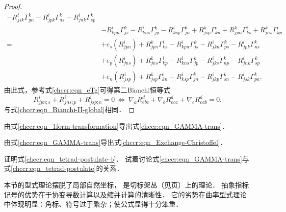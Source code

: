 \begin{proof}
\begin{align*}
        -R_{jsk}^i \Gamma_{pn}^k -R_{jpk}^i \Gamma_{ns}^k -R_{jnk}^i \Gamma_{sp}^k  \\
        & -R_{kpn}^i \Gamma_{js}^k -R_{kns}^i \Gamma_{jp}^k -R_{ksp}^i \Gamma_{jn}^k
        +R_{jsp}^k \Gamma_{kn}^i +R_{jpn}^k \Gamma_{ks}^i +R_{jns}^k \Gamma_{kp}^i  \\
        =& +e_{s} (R_{jpn}^i)+R_{jpn}^k \Gamma_{ks}^i -R_{kpn}^i \Gamma_{js}^k
        -R_{jkn}^i \Gamma_{ps}^k    -R_{jpk}^i \Gamma_{ns}^k \\
        &+e_{p} (R_{jns}^i)+R_{jns}^k \Gamma_{kp}^i  -R_{kns}^i \Gamma_{jp}^k
        -R_{jks}^i \Gamma_{np}^k       -R_{jnk}^i \Gamma_{sp}^k   \\
        &+e_{n} (R_{jsp}^i) +R_{jsp}^k \Gamma_{kn}^i -R_{ksp}^i \Gamma_{jn}^k
        -R_{jkp}^i \Gamma_{sn}^k       -R_{jsk}^i \Gamma_{pn}^k   .
    \end{align*}
    由此式，参考式\eqref{chccr:eqn_eTg}可得第二Bianchi恒等式
    \begin{equation}\label{chccr:eqn_Bianchi-II}
       R^i_{jpn;s} + R^i_{jns;p} + R^i_{jsp;n} =0 
       \ \Leftrightarrow \ 
        \nabla_a R^d_{ebc} + \nabla_b R^d_{eca}+ \nabla_c R^d_{eab} =0 .
    \end{equation}
    与式\eqref{chccr:eqn_Bianchi-II-global}相同．
\end{proof}

\begin{exercise}
	由式\eqref{chccr:eqn_1form-transformation}导出式\eqref{chccr:eqn_GAMMA-trans}．
\end{exercise}


\begin{exercise}
	由式\eqref{chccr:eqn_GAMMA-trans}导出式\eqref{chccr:eqn_Exchange-Christoffel}．
\end{exercise}

\begin{exercise}
	证明式\eqref{chccr:eqn_tetrad-postulate-b}．
	试着讨论式\eqref{chccr:eqn_GAMMA-trans}与式\eqref{chccr:eqn_tetrad-postulate}的关系．
\end{exercise}



\begin{remark}\label{chccr:rek_abstract-i-n}
	本节的型式理论摆脱了局部自然坐标，
	是切标架丛（见\pageref{chfb:sec_tangent-frame-bundles}页）上的理论．
	抽象指标记号的优势在于协变导数计算以及缩并计算的清晰性．
	它的劣势在曲率型式理论中体现明显：角标、符号过于繁杂；使公式显得十分笨重．
\end{remark}



